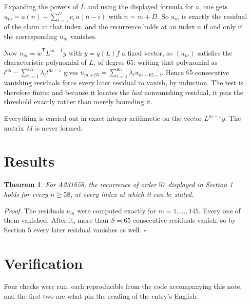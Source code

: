 \documentclass[11pt]{article}
\newtheorem{theorem}{Theorem}
\theoremstyle{definition}
\begin{document}
Expanding the powers of $L$ and using the displayed formula for $a$, one gets $u_m = a(n) - \sum_{i=1}^{D} c_i\,a(n-i)$ with $n = m + D$. So $u_m$ is exactly the residual of the claim at that index, and the recurrence holds at an index $n$ if and only if the corresponding $u_m$ vanishes.

Now $u_m = \tilde w^{\mathsf T} L^{m-1} y$ with $y = q(L)\tilde f$ a fixed vector, so $(u_m)$ satisfies the characteristic polynomial of $L$, of degree $65$: writing that polynomial as $t^{65} - \sum_{i=1}^{65} \lambda_i t^{65-i}$ gives $u_{m+65} = \sum_{i=1}^{65} \lambda_i u_{m+65-i}$. Hence $65$ consecutive vanishing residuals force every later residual to vanish, by induction. The test is therefore finite; and because it locates the {\itshape last} nonvanishing residual, it pins the threshold exactly rather than merely bounding it.

Everything is carried out in exact integer arithmetic on the vector $L^{m-1}y$. The matrix $M$ is never formed.

\section{Results}

\begin{theorem} For A231658, the recurrence of order $57$ displayed in Section 1 holds for every $n \ge 58$, at every index at which it can be stated.\end{theorem}

{\itshape Proof.} The residuals $u_m$ were computed exactly for $m = 1,\dots,145$. Every one of them vanished. After it, more than $S = 65$ consecutive residuals vanish, so by Section 5 every later residual vanishes as well. $\square$

\section{Verification}

Four checks were run, each reproducible from the code accompanying this note, and the first two are what pin the reading of the entry's English.
\end{document}
